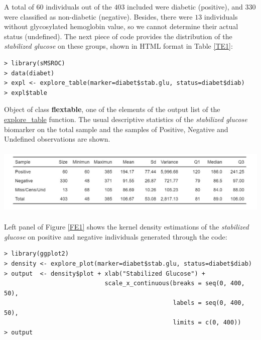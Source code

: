 A total of $60$ individuals out of the $403$ included were diabetic (positive), and $330$ were classified as non-diabetic (negative). Besides, there were $13$ individuals without glycosylated hemoglobin value, so we cannot determine their actual status (undefined). The next piece of code provides the distribution of the \textit{stabilized glucose} on these groups, shown in HTML format in Table \ref{TE1}:
\begin{verbatim}
> library(sMSROC)
> data(diabet)
> expl <- explore_table(marker=diabet$stab.glu, status=diabet$diab)
> expl$table
\end{verbatim}

\begin{table}[h]
\caption{{\footnotesize{Object of class {\bf{flextable}}, one of the elements of the output list of the {\url{explore_table}} function. The usual descriptive statistics of the {\textit{stabilized glucose}} biomarker on the total sample and the samples of Positive, Negative and Undefined observations are shown.} \label{TE1}}}
\begin{center}
\includegraphics[width=14.0cm , height=3.25cm]{figures/TableStabGlu.jpeg} \\
\end{center}
\end{table} 

Left panel of Figure \ref{FE1} shows the kernel density estimations of the \textit{stabilized glucose} on positive and negative individuals generated through the code:
\begin{verbatim}
> library(ggplot2)
> density <- explore_plot(marker=diabet$stab.glu, status=diabet$diab)
> output  <- density$plot + xlab("Stabilized Glucose") +
                            scale_x_continuous(breaks = seq(0, 400, 50),
                                               labels = seq(0, 400, 50), 
                                               limits = c(0, 400))
> output
\end{verbatim}

